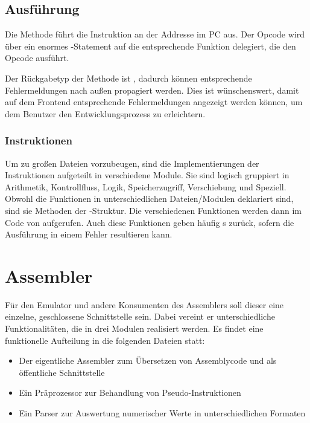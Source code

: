 \subsection{Ausführung}

Die  Methode führt die Instruktion an der Addresse im PC aus. Der Opcode wird über ein enormes -Statement auf die entsprechende Funktion delegiert, die den Opcode ausführt.

Der Rückgabetyp der Methode ist , dadurch können entsprechende Fehlermeldungen nach außen propagiert werden. Dies ist wünschenswert, damit auf dem Frontend entsprechende Fehlermeldungen angezeigt werden können, um dem Benutzer den Entwicklungsprozess zu erleichtern.

\subsubsection{Instruktionen}

Um zu großen Dateien vorzubeugen, sind die Implementierungen der Instruktionen aufgeteilt in verschiedene Module. Sie sind logisch gruppiert in Arithmetik, Kontrollfluss, Logik, Speicherzugriff, Verschiebung und Speziell.
Obwohl die Funktionen in unterschiedlichen Dateien/Modulen deklariert sind, sind sie Methoden der -Struktur.
Die verschiedenen Funktionen werden dann im Code von  aufgerufen.
Auch diese Funktionen geben häufig s zurück, sofern die Ausführung in einem Fehler resultieren kann.

\section{Assembler}

Für den Emulator und andere Konsumenten des Assemblers soll dieser eine einzelne, geschlossene Schnittstelle sein. Dabei vereint er unterschiedliche Funktionalitäten, die in drei Modulen realisiert werden. Es findet eine funktionelle Aufteilung in die folgenden Dateien statt:

\begin{itemize}
	\item Der eigentliche Assembler zum Übersetzen von Assemblycode und als öffentliche Schnittstelle
	\item Ein Präprozessor zur Behandlung von Pseudo-Instruktionen
	\item Ein Parser zur Auswertung numerischer Werte in unterschiedlichen Formaten
\end{itemize}

